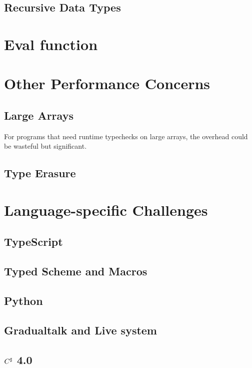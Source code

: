 \subsection{Recursive Data Types}

\section{Eval function}

\section{Other Performance Concerns}

\subsection{Large Arrays}

For programs that need runtime typechecks on large arrays,
the overhead could be wasteful but significant.

\subsection{Type Erasure}

\section{Language-specific Challenges}

\subsection{TypeScript}

\subsection{Typed Scheme and Macros}

\subsection{Python}

\subsection{Gradualtalk and Live system}

\subsection{$C^\sharp$ 4.0}

